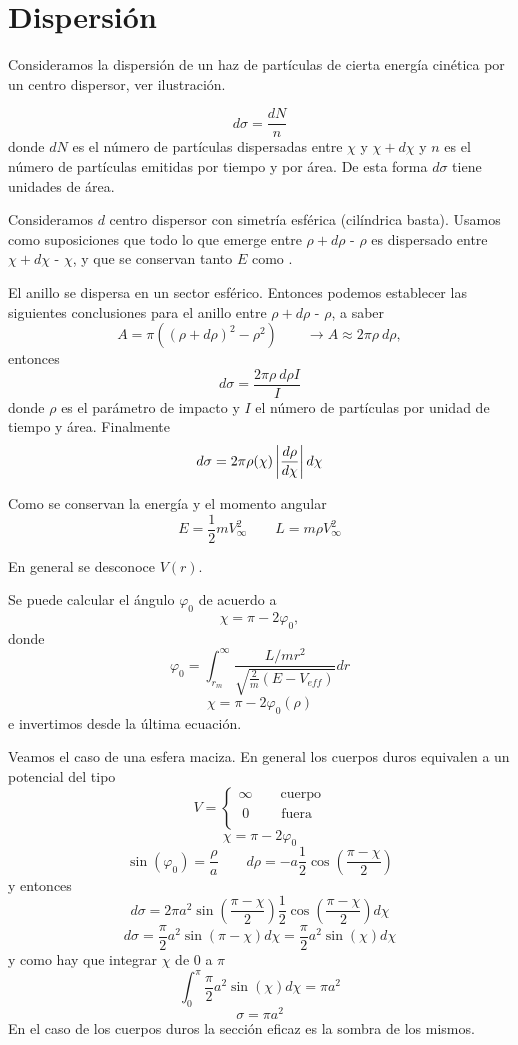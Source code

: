 \documentclass[10pt,oneside]{CBFT_book}
\begin{document}
\section{Dispersión}

Consideramos la dispersión de un haz de partículas de cierta energía cinética por un centro dispersor,
ver ilustración.

\[
	d\sigma = \frac{dN}{n}
\]
donde $dN$ es el número de partículas dispersadas entre $\chi$ y $\chi + d\chi$ y $n$ es el número de
partículas emitidas por tiempo y por área. De esta forma $d\sigma$ tiene unidades de área.

Consideramos $d$ centro dispersor con simetría esférica (cilíndrica basta).
Usamos como suposiciones que todo lo que emerge entre $\rho + d\rho$ - $\rho$  es dispersado entre
$\chi + d\chi$ - $\chi$, y que se conservan tanto $E$ como .

El anillo se dispersa en un sector esférico. Entonces podemos establecer las siguientes conclusiones
para el anillo entre $\rho + d\rho$ - $\rho$, a saber
\[
	A =  \pi ( (\rho + d\rho)^2 - \rho^2 ) \qquad \longrightarrow A \approx 2 \pi \rho \: d\rho,
\]
entonces
\[
	d\sigma = \frac{  2 \pi \rho \: d\rho I}{I}
\]
donde $\rho$ es el parámetro de impacto y $I$ el número de partículas por unidad de tiempo y área.
Finalmente
\[
	d\sigma =  2 \pi \rho(\chi) \left| \frac{d^{\hspace{-0.05em}} {\rho}}{d {\chi}^{\hspace{-0.05em}}} \right| d\chi
\]

Como se conservan la energía y el momento angular
\[
	E = \frac{1}{2} m V_\infty^2 \qquad L = m \rho V_\infty^2 
\]

En general se desconoce $V(r)$.

Se puede calcular el ángulo $\varphi_0$ de acuerdo a 
\[
	\chi = \pi - 2\varphi_0,
\]
donde
\[
	\varphi_0 = \int_{r_m}^{\infty} \frac{L/mr^2}{\sqrt{\frac{2}{m}(E - V_{eff})}} dr
\]
\[
	\chi = \pi - 2 \varphi_0 (\rho)
\]
e invertimos desde la última ecuación.

Veamos el caso de una esfera maciza. En general los cuerpos duros equivalen a un potencial del tipo
\[
	V = \begin{cases}
	     \infty \qquad \textrm{cuerpo}\\
	     \;0 \qquad \; \textrm{fuera} \\
	    \end{cases}
\]
\[
	\chi = \pi - 2\varphi_0
\]
\[
	\sin(\varphi_0) = \frac{\rho}{a} \qquad d\rho = -a \frac{1}{2}\cos \left(\frac{\pi-\chi}{2}\right)
\]
y entonces 
\[
	d\sigma = 2\pi a^2 \sin\left(\frac{\pi-\chi}{2}\right) \frac{1}{2}\cos\left(\frac{\pi-\chi}{2}\right) d\chi
\]
\[
	d\sigma = \frac{\pi}{2} a^2 \sin( \pi-\chi) d\chi = \frac{\pi}{2} a^2 \sin( \chi) d\chi
\]
y como hay que integrar $\chi$ de 0 a $\pi$
\[
	\int_0^\pi \frac{\pi}{2} a^2 \sin( \chi) d\chi = \pi a^2
\]
\[
	\sigma = \pi a^2
\]
En el caso de los cuerpos duros la sección eficaz es la sombra de los mismos.
\end{document}
